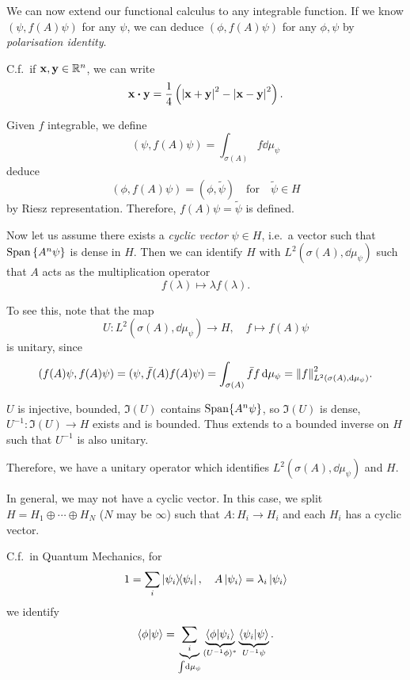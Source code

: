 \documentclass[a4paper,11pt]{article}
\begin{document}
	We can now extend our functional calculus to any integrable function. If we know $(\psi, f(A) \psi)$ for any $\psi$, we can deduce $(\phi, f(A)\psi)$ for any $\phi, \psi$ by \emph{polarisation identity}. 

	C.f.\ if $\vb x, \vb y \in \mathbb{R}^n$, we can write 
	\[
		\vb x \vdot \vb y = \frac{1}{4} \left( \abs{\vb x + \vb y}^2 - \abs{\vb x - \vb y}^2 \right).
	\]
	
	Given $f$ integrable, we define 
	\[
		(\psi, f(A) \psi) = \int _{\sigma(A)} f \dd{\mu_\psi}
	\]
	deduce
	\[
		(\phi, f(A) \psi) = (\phi, \tilde \psi) \quad \text{for} \quad \tilde \psi \in H
	\]
	by Riesz representation. Therefore, $f(A) \psi = \tilde \psi$ is defined.

	Now let us assume there exists a \emph{cyclic vector} $\psi \in H$, i.e.\ a vector such that $\operatorname{Span}\left\{ A^n \psi \right\}$ is dense in $H$. Then we can identify $H$ with $L^2 (\sigma(A), \dd{\mu_\psi})$ such that $A$ acts as the multiplication operator
	\[
		f(\lambda) \mapsto \lambda f(\lambda).
	\]
	 
	To see this, note that the map
	\[
		U: L^2(\sigma(A), \dd{\mu_\psi}) \to H, \quad f \mapsto f(A) \psi
	\]
	is unitary, since 
	\[
		(f(A)\psi, f(A)\psi) = (\psi, \bar f(A) f(A) \psi) = \int _{\sigma(A)} \bar f f \dd{\mu_\psi} = \norm{f}^2 _{L^2 (\sigma(A), \dd{\mu_\psi})}.
	\]
	 
	$U$ is injective, bounded, $\Im(U)$ contains $\operatorname{Span} \{A^n \psi\}$, so $\Im(U)$ is dense, $U^{-1}: \Im(U) \to H$ exists and is bounded. Thus extends to a bounded inverse on $H$ such that $U^{-1}$ is also unitary.

	Therefore, we have a unitary operator which identifies $L^2 (\sigma(A), \dd{\mu_\psi})$ and $H$.

	In general, we may not have a cyclic vector. In this case, we split $H = H_1 \oplus \cdots \oplus H_N$ ($N$ may be $\infty$) such that $A : H_i \to H_i$ and each $H_i$ has a cyclic vector.

	C.f.\ in Quantum Mechanics, for 
	\[
		1 = \sum_i \dyad{\psi_i}{\psi_i}, \quad A \ket{\psi_i} = \lambda_i \ket{\psi_i}
	\]
	we identify
	\[
		\braket{\phi}{\psi} = \underbrace{\sum_i}_{\int \dd{\mu_\psi}} \underbrace{\braket{\phi}{\psi_i}}_{(U^{-1} \phi)^*} \underbrace{\braket{\psi_i}{\psi}}_{U^{-1} \psi}.
	\]
	
\end{document}
